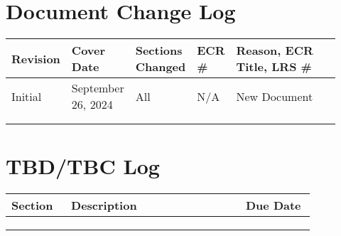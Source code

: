 \section*{Document Change Log}



\begin{table}[!h]
\begin{tabular}
{
| p{0.15\linewidth} 
| p{0.12\linewidth}
| p{0.15\linewidth}
| p{0.1\linewidth}
| p{0.4\linewidth}
|
}
\hline
\rowcolor[HTML]{92A1CB} 
Revision & Cover Date  & Sections Changed & ECR \# & Reason, ECR Title, LRS \# \\ \hline
Initial & September 26, 2024 & All & N/A & New Document \\ \hline
 &  &  &  &  \\ \hline
 &  &  &  &  \\ \hline
\end{tabular}
\end{table}

\section*{TBD/TBC Log}



\begin{table}[!h]
\begin{tabular}
{
| p{0.15\linewidth} 
| p{0.5\linewidth}
| p{0.2\linewidth}
|
}
\hline
\rowcolor[HTML]{92A1CB} 
Section & Description & Due Date \\ \hline
 &  &   \\ \hline
 &  &   \\ \hline
 &  &   \\ \hline
\end{tabular}
\end{table}

